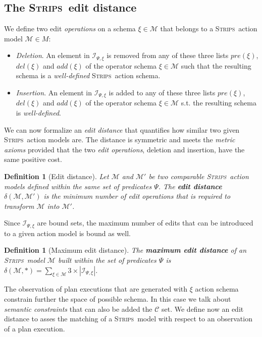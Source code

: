 \documentclass[letterpaper]{article} %
\newcommand{\strips}{\textsc{Strips}}     %
\newtheorem{definition}[theorem]{Definition}
\begin{document}
\subsection{The \strips\ edit distance}
We define two edit \emph{operations} on a schema $\xi\in\mathcal{M}$ that belongs to a \strips\ action model $\mathcal{M}\in M$:
\begin{itemize}
\item {\em Deletion}. An element in ${\mathcal I}_{\Psi,\xi}$ is removed from any of these three lists $pre(\xi)$, $del(\xi)$ and $add(\xi)$ of the operator schema $\xi\in\mathcal{M}$ such that the resulting schema is a {\em well-defined} \strips\ action schema.
\item {\em Insertion}. An element in ${\mathcal I}_{\Psi,\xi}$ is added to any of these three lists $pre(\xi)$, $del(\xi)$ and $add(\xi)$ of the operator schema $\xi\in\mathcal{M}$ s.t. the resulting schema is {\em well-defined}.
\end{itemize}

We can now formalize an {\em edit distance} that quantifies how similar two given \strips\ action models are. The distance is symmetric and meets the {\em metric axioms} provided that the two {\em edit operations}, deletion and insertion, have the same positive cost.

\begin{definition}[Edit distance]
  Let $\mathcal{M}$ and $\mathcal{M}'$ be two {\em comparable} \strips\ action models defined within the same set of predicates $\Psi$. The {\bf edit distance} $\delta(\mathcal{M},\mathcal{M}')$ is the minimum number of {\em edit operations} that is required to transform $\mathcal{M}$ into $\mathcal{M}'$.
\end{definition}

Since ${\mathcal I}_{\Psi,\xi}$ are bound sets, the maximum number of edits that can be introduced to a given action model is bound as well. 
\begin{definition}[Maximum edit distance]
The \textbf{maximum edit distance} of an \strips\ model $\mathcal{M}$ built within the set of predicates $\Psi$ is $\delta(\mathcal{M},*)=\sum_{\xi\in\mathcal{M}} 3\times|{\mathcal I}_{\Psi,\xi}|$.
\end{definition}

The observation of plan executions that are generated with $\xi$ action schema constrain further the space of possible schema. In this case we talk about {\em semantic constraints} that can also be added the $\mathcal{C}$ set. We define now an edit distance to asses the matching of a \strips\ model with respect to an observation of a plan execution. 
\end{document}

